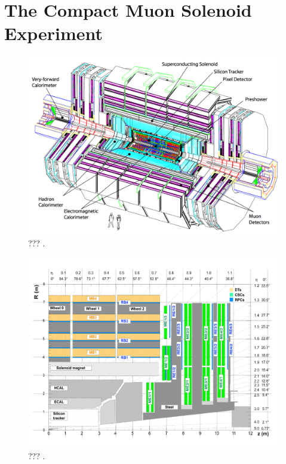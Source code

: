 \chapter{The Compact Muon Solenoid Experiment}
\label{chap:I-3-cms}

  \begin{figure}[h!]
    \centering
    \includegraphics[width=\textwidth]{img/I-3-cms/cms.png}
    \caption{??? \cite{1748-0221-3-08-S08004}.}
    \label{fig:I-3-cms-global-view}
  \end{figure}

  \begin{figure}[h!]
    \centering
    \includegraphics[width=\textwidth]{img/I-3-cms/quadrant-postls1.pdf}
    \caption{??? \cite{1748-0221-3-08-S08004}.}
    \label{fig:I-3-cms-quadrant}
  \end{figure}

